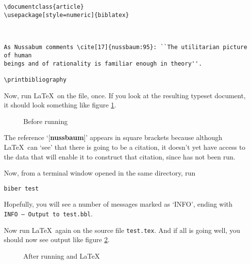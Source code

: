 \begin{verbatim}
\documentclass{article}
\usepackage[style=numeric]{biblatex}



As Nussabum comments \cite[17]{nussbaum:95}: ``The utilitarian picture of human
beings and of rationality is familiar enough in theory''.

\printbibliography

\end{verbatim}

Now, run \LaTeX\ on the file, once. If you look at the resulting typeset document, it should look something like figure \ref{nussbaum1}.

\begin{figure}
\caption{Before running }\label{nussbaum1}
\end{figure}

The reference `[\textbf{nussbaum}]' appears in square brackets because although \LaTeX\ can `see' that there is going to be a citation, it doesn't yet have access to the data that will enable it to construct that citation, since  has not been run.

Now, from a terminal window opened in the same directory, run
\begin{verbatim}
biber test
\end{verbatim}

Hopefully, you will see a number of messages marked as `INFO', ending with \texttt{INFO -- Output to test.bbl}.

Now run \LaTeX\ again on the source file \verb|test.tex|. And if all is going well, you should now see output like figure \ref{nussbaum2}.

\begin{figure}
\caption{After running  and \LaTeX}\label{nussbaum2}
\end{figure}

